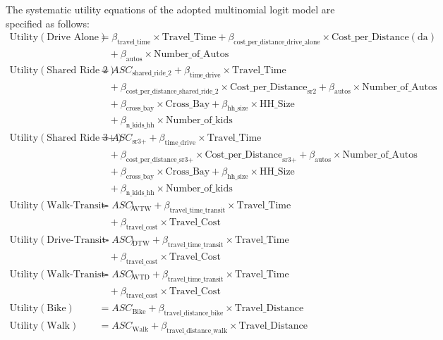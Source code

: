 The systematic utility equations of the adopted multinomial logit model are specified as follows:
\begin{align*}
\textrm{Utility} \left(\textrm{Drive Alone}\right) &= \beta_{\textrm{travel\_time}} \times \textrm{Travel\_Time} + \beta_{\textrm{cost\_per\_distance\_drive_alone}} \times \textrm{Cost\_per\_Distance}\left(\textrm{da}\right) \\
    &\quad + \beta_{\textrm{autos}} \times \textrm{Number\_of\_Autos} \\
\textrm{Utility} \left(\textrm{Shared Ride 2}\right) &= ASC_{\textrm{shared\_ride\_2}} + \beta_{\textrm{time\_drive}} \times \textrm{Travel\_Time} \\
    &\quad + \beta_{\textrm{cost\_per\_distance\_shared\_ride\_2}} \times \textrm{Cost\_per\_Distance}_{ \textrm{sr2} } + \beta_{\textrm{autos}}  \times \textrm{Number\_of\_Autos} \\
    &\quad + \beta_{\textrm{cross\_bay}} \times \textrm{Cross\_Bay} + \beta_{\textrm{hh\_size}} \times \textrm{HH\_Size} \\
    &\quad + \beta_{\textrm{n\_kids\_hh}} \times \textrm{Number\_of\_kids} \\
\textrm{Utility} \left(\textrm{Shared Ride 3+}\right) &= ASC_{\textrm{sr3+}} + \beta_{\textrm{time\_drive}} \times \textrm{Travel\_Time} \\
    &\quad + \beta_{\textrm{cost\_per\_distance\_sr3+}} \times \textrm{Cost\_per\_Distance}_{\textrm{sr3+}} + \beta_{\textrm{autos}}  \times \textrm{Number\_of\_Autos} \\
    &\quad + \beta_{\textrm{cross\_bay}} \times \textrm{Cross\_Bay} + \beta_{\textrm{hh\_size}} \times \textrm{HH\_Size} \\
    &\quad + \beta_{\textrm{n\_kids\_hh}} \times \textrm{Number\_of\_kids} \\
\textrm{Utility} \left(\textrm{Walk-Transit-Walk}\right) &= ASC_{\textrm{WTW}} + \beta_{\textrm{travel\_time\_transit}} \times \textrm{Travel\_Time} \\
    &\quad + \beta_{\textrm{travel\_cost}} \times \textrm{Travel\_Cost} \\
\textrm{Utility} \left(\textrm{Drive-Transit-Walk}\right) &= ASC_{\textrm{DTW}} + \beta_{\textrm{travel\_time\_transit}} \times \textrm{Travel\_Time} \\
    &\quad + \beta_{\textrm{travel\_cost}} \times \textrm{Travel\_Cost} \\
\textrm{Utility} \left(\textrm{Walk-Tranist-Drive}\right) &= ASC_{\textrm{WTD}} + \beta_{\textrm{travel\_time\_transit}} \times \textrm{Travel\_Time} \\
    &\quad + \beta_{\textrm{travel\_cost}} \times \textrm{Travel\_Cost} \\
\textrm{Utility} \left(\textrm{Bike}\right) &= ASC_{\textrm{Bike}} + \beta_{\textrm{travel\_distance\_bike}} \times \textrm{Travel\_Distance} \\
\textrm{Utility} \left(\textrm{Walk}\right) &= ASC_{\textrm{Walk}} + \beta_{\textrm{travel\_distance\_walk}} \times \textrm{Travel\_Distance} \\
\end{align*}

